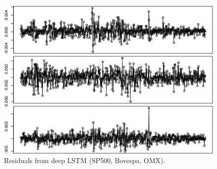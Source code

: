 \documentclass[12pt, letterpaper]{amsart}%
\begin{document}
\begin{figure}[H]
\caption{Residuals from deep LSTM (SP500, Bovespa, OMX).}
\centering
\includegraphics[scale=0.4]{lstm_deep_resid.png}
\end{figure}

\end{document}
